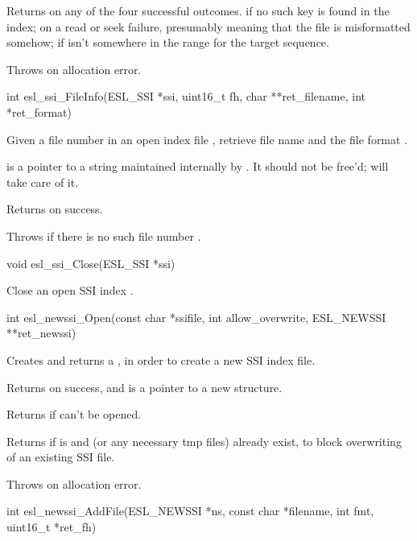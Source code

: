\begin{sreapi}
Returns          on any of the four successful outcomes.
  if no such key is found in the index;
 on a read or seek failure, presumably meaning that
the file is misformatted somehow;
  if  isn't somewhere in the range
 for the target sequence.

Throws  on allocation error.                       


\hypertarget{func:esl_ssi_FileInfo()}
{\item[int esl\_ssi\_FileInfo(ESL\_SSI *ssi, uint16\_t fh, char **ret\_filename, int *ret\_format)]}

Given a file number  in an open index file
, retrieve file name  and
the file format . 

 is a pointer to a string maintained
internally by . It should not be free'd; 
 will take care of it.

Returns  on success.

Throws  if there is no such file number .


\hypertarget{func:esl_ssi_Close()}
{\item[void esl\_ssi\_Close(ESL\_SSI *ssi)]}

Close an open SSI index .



\hypertarget{func:esl_newssi_Open()}
{\item[int esl\_newssi\_Open(const char *ssifile, int allow\_overwrite, ESL\_NEWSSI **ret\_newssi)]}

Creates and returns a , in order to create a 
new SSI index file.

Returns  on success, and  is a pointer to a
new  structure.

Returns  if  can't be opened.

Returns  if  is 
and  (or any necessary tmp files) already
exist, to block overwriting of an existing SSI file.

Throws  on allocation error.


\hypertarget{func:esl_newssi_AddFile()}
{\item[int esl\_newssi\_AddFile(ESL\_NEWSSI *ns, const char *filename, int fmt, uint16\_t *ret\_fh)]}


\end{sreapi}
